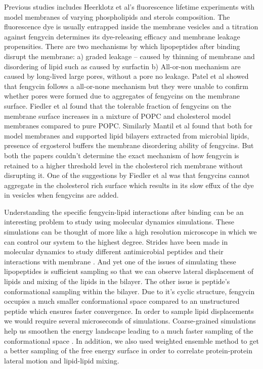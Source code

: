 Previous studies includes Heerklotz et al's fluorescence lifetime experiments with model membranes of varying phospholipids 
and sterols composition. \cite{Heerklotz2008, Heerklotz2001} The fluorescence dye is usually entrapped inside the 
membrane vesicles and a titration against fengycin determines its dye-releasing efficacy and membrane leakage propensities. 
There are two mechanisms by which lipopeptides after binding disrupt the membrane: a) graded leakage -- caused by 
thinning of membrane and disordering of lipid such as caused by surfactin\cite{Heerklotz2011,Seelig2007} b) 
All-or-non mechanism are caused by long-lived large pores, without a pore no leakage\cite{Heerklotz2011}. Patel et 
al \cite{Heerklotz2011} showed that fengycin follows a all-or-none mechanism but they were unable to confirm 
whether pores were formed due to aggregates of fengycins on the membrane surface.
 Fiedler et al found that the tolerable fraction of fengycins on the membrane surface increases 
in a mixture of POPC and cholesterol model membranes compared to pure POPC.\cite{Heerklotz2015}
Similarly Mantil et al found that both for model membranes and supported lipid bilayers extracted from microbial 
lipids, presence of ergosterol buffers the membrane disordering ability of 
fengycins.\cite{MantilTyler2019,MantilAvis2019}
But both the papers couldn't determine the exact mechanism of how fengycin  is retained 
to a higher threshold level in the cholesterol rich membrane without disrupting it.
One of the suggestions by Fiedler et al was that fengycins cannot aggregate in the 
cholesterol rich surface which results in its slow effux of the dye in vesicles when fengycins are 
added\cite{Heerklotz2015}.

Understanding the specific fengycin-lipid interactions after binding can be an interesting problem to study using molecular dynamics simulations. 
These simulations can be thought of more like a high resolution microscope in which we can control our system to the highest degree. 
Strides have been made in molecular dynamics to study different antimicrobial
peptides and their interactions with membrane \cite{Schulten1993, Tieleman2007, Pastor2016}.
And yet one of the issues of simulating these lipopeptides is sufficient sampling so that we can observe lateral displacement of lipids and mixing of the lipids in the bilayer. The other issue is peptide's conformational sampling within the bilayer. Due to it's cyclic structure, fengycin occupies a much smaller conformational space compared to an unstructured peptide which ensures faster convergence. In order to sample lipid displacements we would require several microseconds of simulations.
Coarse-grained simulations help us smoothen the energy landscape leading to a much faster sampling of the conformational space \cite{Marrink2013}.
In addition, we also used weighted ensemble method to get a better sampling of the free energy surface in order to correlate protein-protein lateral motion and lipid-lipid mixing\cite{Chong2017}.
 
